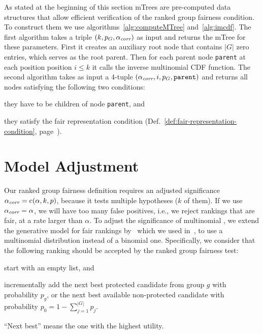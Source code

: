 

As stated at the beginning of this section mTrees are pre-computed data structures that allow efficient verification of the ranked group fairness condition.
%
To construct them we use algorithms~\ref{alg:computeMTree} and~\ref{alg:imcdf}.
%
The first algorithm \algoComputeMTree takes a triple $(k,p_G,\alpha_\textit{corr})$ as input and returns the mTree for these parameters.
%
First it creates an auxiliary root node that contains $|G|$ zero entries, which serves as the root parent.
%
Then for each parent node \texttt{parent} at each position position $i \leq k$ it calls the inverse multinomial CDF function.
%
The second algorithm \algoImcdf takes as input a 4-tuple $(\alpha_\textit{corr}, i, p_G, \texttt{parent})$ and returns all nodes satisfying the following two conditions:
\begin{inparaenum}[(i.)]
	\item they have to be children of node \texttt{parent}, and
	\item they satisfy the fair representation condition (Def.~\ref{def:fair-representation-condition}, page~\pageref{def:fair-representation-condition}).
\end{inparaenum}

\section{Model Adjustment}
\label{sec:model-adjustment}

Our ranked group fairness definition requires an adjusted significance $\alpha_\textit{corr} = \operatorname{c}(\alpha, k, p)$, because it tests multiple hypotheses ($k$ of them).
%
If we use $\alpha_\textit{corr} = \alpha$, we will have too many false positives, i.e., we reject rankings that are fair, at a rate larger than $\alpha$.
%
To adjust the significance of multinomial \algoFAIR, we extend the generative model for fair rankings by~\citet{yang2016measuring} which we used in~\cite{zehlike2017fair}, to use a multinomial distribution instead of a binomial one.
%
Specifically, we consider that the following ranking should be accepted by the ranked group fairness test: \begin{inparaenum}[(i)]
	\item start with an empty list, and
	\item incrementally add the next best protected candidate from group $g$ with probability $p_g$, or the next best available non-protected candidate with probability $p_0 = 1-\sum_{j=1}^{|G|} p_j$.
\end{inparaenum}
%
``Next best'' means the one with the highest utility.

